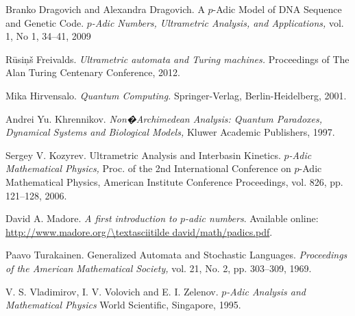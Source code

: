\documentclass{llncs}
\begin{document}
\begin{thebibliography}{99}

Branko Dragovich and Alexandra Dragovich.
A $p$-Adic Model
of DNA Sequence and Genetic Code.
{\em $p$-Adic Numbers, Ultrametric Analysis, and Applications,}
vol. 1, No 1, 34--41, 2009

R\= usi\c n\v s Freivalds.
{\em Ultrametric automata and Turing machines.} Proceedings of The Alan Turing Centenary Conference, 2012.

Mika Hirvensalo.
{\em Quantum Computing.} Springer-Verlag, Berlin-Heidelberg,  2001.

Andrei Yu. Khrennikov.
{\em Non�Archimedean Analysis: Quantum Paradoxes, Dynamical Systems and
Biological Models,} Kluwer Academic Publishers, 1997.
	
Sergey V. Kozyrev. 
Ultrametric Analysis and Interbasin Kinetics.
{\em $p$-Adic Mathematical Physics,} Proc. of the 2nd International Conference on $p$-Adic 
Mathematical Physics, American Institute Conference Proceedings,
vol. 826, pp. 121--128, 2006.

David A. Madore.
{\em A first introduction to $p$-adic numbers}. Available online: \url{http://www.madore.org/\textasciitilde david/math/padics.pdf}.

Paavo Turakainen.
Generalized Automata and Stochastic Languages.
{\em Proceedings of the American Mathematical Society,} vol. 21, No. 2, pp. 303--309, 1969.

V. S. Vladimirov, I. V. Volovich and E. I. Zelenov.
{\em $p$-Adic Analysis and Mathematical Physics} 
World Scientific, Singapore, 1995. 

\end{thebibliography}
\end{document}
